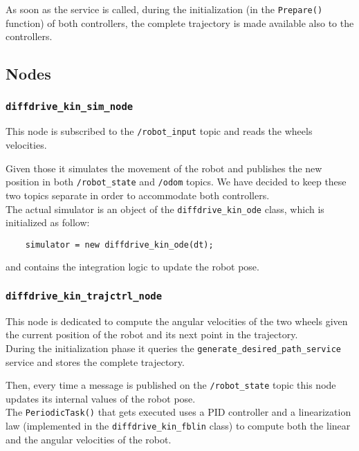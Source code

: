 \documentclass[11pt,a4paper]{article}
\begin{document}
As soon as the service is called, during the initialization (in the \texttt{Prepare()} function) of both controllers, the complete trajectory is made available also to the controllers.


\subsection{Nodes}

\subsubsection{\texttt{diffdrive\_kin\_sim\_node}}

This node is subscribed to the \texttt{/robot\_input} topic and reads the wheels velocities.

Given those it simulates the movement of the robot and publishes the new position in both \texttt{/robot\_state} and \texttt{/odom} topics. We have decided to keep these two topics separate in order to accommodate both controllers.\\

The actual simulator is an object of the \texttt{diffdrive\_kin\_ode} class, which is initialized as follow:
\begin{lstlisting}
    simulator = new diffdrive_kin_ode(dt);
\end{lstlisting}

and contains the integration logic to update the robot pose.

\subsubsection{\texttt{diffdrive\_kin\_trajctrl\_node}}

This node is dedicated to compute the angular velocities of the two wheels given the current position of the robot and its next point in the trajectory.\\

During the initialization phase it queries the \texttt{generate\_desired\_path\_service} service and stores the complete trajectory.

Then, every time a message is published on the \texttt{/robot\_state} topic this node updates its internal values of the robot pose.\\

The \texttt{PeriodicTask()} that gets executed uses a PID controller and a linearization law (implemented in the \texttt{diffdrive\_kin\_fblin} class) to compute both the linear and the angular velocities of the robot.
\end{document}
